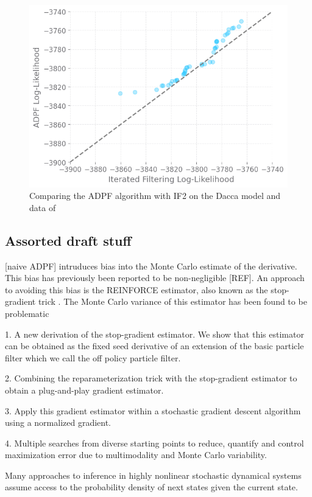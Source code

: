 \documentclass[9pt,twocolumn,twoside]{pnas-new}
\begin{document}
\begin{figure}%
\centering
\includegraphics[width=.8\linewidth]{23-09-05-adpf-vs-if2.png}
\caption{Comparing the ADPF algorithm with IF2 on the Dacca model and data of \citep{king08}}
  \label{fig:dacca-fit}
\end{figure}


\subsection*{Assorted draft stuff}
  
[naive ADPF] intruduces bias into the Monte Carlo estimate of the derivative.
This bias has previously been reported to be non-negligible [REF].
An approach to avoiding this bias is the REINFORCE estimator, also known as the stop-gradient trick \cite{scibior21}.
The Monte Carlo variance of this estimator has been found to be problematic \cite{scibior21}

1. A new derivation of the stop-gradient estimator. We show that this estimator can be obtained as the fixed seed derivative of an extension of the basic particle filter which we call the off policy particle filter.

2. Combining the reparameterization trick with the stop-gradient estimator to obtain a plug-and-play gradient estimator.

3. Apply this gradient estimator within a stochastic gradient descent algorithm using a normalized gradient.

4. Multiple searches from diverse starting points to reduce, quantify and control maximization error due to multimodality and Monte Carlo variability.




Many approaches to inference in highly nonlinear stochastic dynamical systems assume access to the probability density of next states given the current state.
\end{document}
